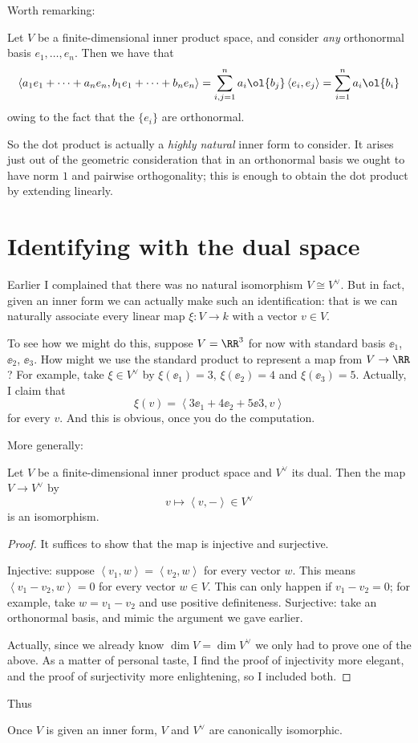 Worth remarking:
\begin{example}
	Let $V$ be a finite-dimensional inner product space,
	and consider \emph{any} orthonormal basis $e_1, \dots, e_n$.
	Then we have that
	\[ \left< a_1e_1 + \dots + a_ne_n, b_1e_1 + \dots + b_ne_n \right> 
		= \sum_{i,j=1}^n a_i\ol{b_j} \left< e_i, e_j \right>
		= \sum_{i=1}^n a_i \ol{b_i} \]
	owing to the fact that the $\{e_i\}$ are orthonormal.
\end{example}
So the dot product is actually a \emph{highly natural} inner form to consider.
It arises just out of the geometric consideration that in an orthonormal basis
we ought to have norm $1$ and pairwise orthogonality;
this is enough to obtain the dot product by extending linearly.


\section{Identifying with the dual space}
Earlier I complained that there was no natural isomorphism $V \cong V^\vee$.
But in fact, given an inner form we can actually make such an identification:
that is we can naturally associate every linear map $\xi : V \to k$ with a vector $v \in V$.

To see how we might do this, suppose $V = \RR^3$ for now with standard basis $\ee_1$, $\ee_2$, $\ee_3$.
How might we use the standard product to represent a map from $V \to \RR$?
For example, take $\xi \in V^\vee$ by $\xi(\ee_1) = 3$, $\xi(\ee_2) = 4$ and $\xi(\ee_3) = 5$.
Actually, I claim that
\[ \xi(v) = \left< 3\ee_1 + 4\ee_2 + 5\ee3, v \right> \]
for every $v$.
And this is obvious, once you do the computation.

More generally:
\begin{theorem}
	Let $V$ be a finite-dimensional inner product space and $V^\vee$ its dual.
	Then the map $V \to V^\vee$ by
	\[ v \mapsto \left<  v, - \right> \in V^\vee \]
	is an isomorphism.
\end{theorem}
\begin{proof}
	It suffices to show that the map is injective and surjective.
	\begin{itemize}
		\ii Injective: suppose $\left< v_1, w \right> = \left< v_2, w \right>$
		for every vector $w$.
		This means $\left< v_1 - v_2, w \right> = 0$ for every vector $w \in V$.
		This can only happen if $v_1 - v_2 = 0$; for example, take $w = v_1 - v_2$
		and use positive definiteness.
		\ii Surjective: take an orthonormal basis, and mimic the argument we gave earlier.
	\end{itemize}
	Actually, since we already know $\dim V = \dim V^\vee$ we only had to prove one of the above.
	As a matter of personal taste, I find the proof of injectivity more elegant,
	and the proof of surjectivity more enlightening, so I included both.
\end{proof}
Thus
\begin{moral}
	Once $V$ is given an inner form, $V$ and $V^\vee$ are canonically isomorphic.
\end{moral}

